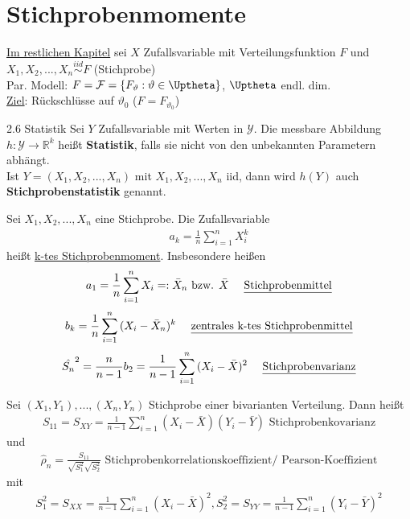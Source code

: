 \documentclass[a4paper,openany]{book}
\theoremstyle{mytheoremstyle}
\theoremstyle{mytheoremstyle2}
\begin{document}
\section{Stichprobenmomente}
\underline{Im restlichen Kapitel} sei $X$ Zufallsvariable mit Verteilungsfunktion $F$ und $X_1,X_2,...,X_n \overset{iid}\sim F$ (Stichprobe) \\
Par. Modell: $F=\mathcal{F}=\left\{F_{\vartheta}:\vartheta\in \Uptheta\right\}$, $\Uptheta$ endl. dim. \\
\underline{Ziel}: Rückschlüsse auf $\vartheta_0$ ($F=F_{\vartheta_0}$) 
\begin{defi}{2.6 Statistik}{}
  Sei $Y$ Zufallsvariable mit Werten in $\mathcal{Y}$. Die messbare Abbildung $h:\mathcal{Y}\to \mathbb{R}^k$ heißt \textbf{Statistik}, falls sie nicht von den unbekannten Parametern abhängt. \\
  Ist $Y=(X_1,X_2,...,X_n)$ mit $X_1,X_2,...,X_n$ iid, dann wird $h(Y)$ auch \textbf{Stichprobenstatistik} genannt.   
\end{defi}
\begin{defi}{2.7}{}
  Sei $X_1,X_2,...,X_n$ eine Stichprobe. Die Zufallsvariable 
  \begin{align*}
    a_k=\frac{1}{n}\sum_{i=1}^{n}{X_i^k}
  \end{align*}
  heißt \underline{k-tes Stichprobenmoment}. Insbesondere heißen 
  \begin{align*}
    a_1=\frac{1}{n}\sum_{i=1}^{n}{X_i}=:\bar{X}_n \text{ bzw. } \bar{X}\quad\text{ \underline{Stichprobenmittel}}
  \end{align*}
  \begin{align*}
    b_k=\frac{1}{n}\sum_{i=1}^{n}{(X_i-\bar{X}_n)^k}\quad\text{ \underline{zentrales k-tes Stichprobenmittel}}
  \end{align*}
  \begin{align*}
    \hat{S_n}^2=\frac{n}{n-1}b_2=\frac{1}{n-1}\sum_{i=1}^{n}{(X_i-\bar{X})^2}\quad\text{ \underline{Stichprobenvarianz}}
  \end{align*}
\end{defi}
\begin{defi}{2.8}{}
  Sei $(X_1,Y_1),...,(X_n,Y_n)$ Stichprobe einer bivarianten Verteilung. Dann heißt 
  \begin{align*}
    S _{11}=S _{XY}=\frac{1}{n-1}\sum_{i=1}^{n}{(X_i-\bar{X})(Y_i-\bar{Y})}\text{ Stichprobenkovarianz}
  \end{align*}
  und
  \begin{align*}
    \hat{\rho }_n=\frac{S _{11}}{\sqrt{S_1^2}\sqrt{S_2^2}}\text{ Stichprobenkorrelationskoeffizient/ Pearson-Koeffizient}
  \end{align*}
  mit 
  \begin{align*}
    S_1^2=S _{XX}=\frac{1}{n-1}\sum_{i=1}^{n}{(X_i-\bar{X})^2}, S_2^2=S _{YY}=\frac{1}{n-1}\sum_{i=1}^{n}{(Y_i-\bar{Y})^2}
  \end{align*}
\end{defi}
\end{document}
